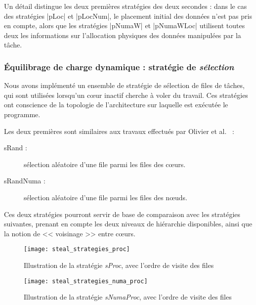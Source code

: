 Un détail distingue les deux premières stratégies des deux secondes : dans le cas des stratégies |pLoc| et |pLocNum|, le placement initial des données n'est pas pris en compte, alors que les stratégies |pNumaW| et |pNumaWLoc| utilisent toutes deux les informations sur l'allocation physiques des données manipulées par la tâche.

\subsubsection{Équilibrage de charge dynamique : stratégie de \emph{sélection}}
\label{sec:openmp:runtime:select}


Nous avons implémenté un ensemble de stratégie de sélection de files de tâches, qui sont utilisées lorsqu'un cœur inactif cherche à voler du travail. Ces stratégies ont conscience de la topologie de l'architecture sur laquelle est exécutée le programme.

Les deux premières sont similaires aux travaux effectués par Olivier et al.~\cite{Olivier2012} :
\begin{description}
  \item [sRand :] sélection aléatoire d'une file parmi les files des cœurs.
  \item [sRandNuma :] sélection aléatoire d'une file parmi les files des nœuds.
\end{description}

Ces deux stratégies pourront servir de base de comparaison avec les stratégies suivantes, prenant en compte les deux niveaux de hiérarchie disponibles, ainsi que la notion de << voisinage >> entre cœurs.

\begin{figure}[t!]
  \centering
  \texttt{[image: steal\_strategies\_proc]}
  \caption{Illustration de la stratégie \emph{sProc}, avec l'ordre de visite des files}\label{fig:openmp:runtime:steal_proc}
\end{figure}

\begin{figure}[h!]
  \centering
  \texttt{[image: steal\_strategies\_numa\_proc]}
  \caption{Illustration de la stratégie \emph{sNumaProc}, avec l'ordre de visite des files}\label{fig:openmp:runtime:steal_numa_proc}
\end{figure}

